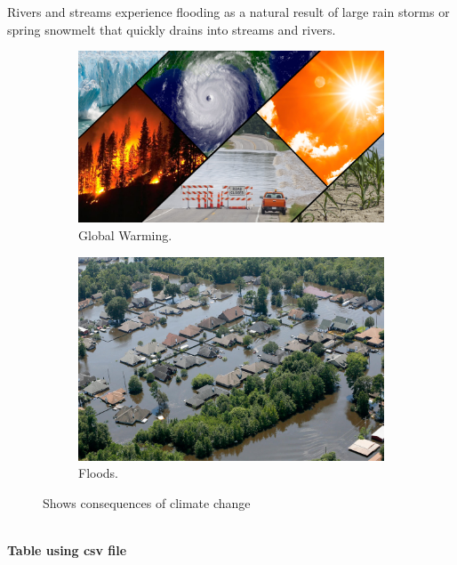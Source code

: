 \documentclass{article}
\begin{document}
\newpage
Rivers and streams experience flooding as a natural result of large rain storms or spring snowmelt that quickly drains into streams and rivers.
\begin{figure}[h!]
  \centering
  \begin{subfigure}[b]{0.47\linewidth}
    \includegraphics[width=\linewidth]{c.jpg}
    \caption{Global Warming.}
  \end{subfigure}
  \begin{subfigure}[b]{0.4\linewidth}
    \includegraphics[width=\linewidth]{flood.jpg}
    \caption{Floods.}
  \end{subfigure}
  \caption{Shows consequences of climate change}
  \label{fig:coffee}
\end{figure}
\\
\textbf{Table using csv file}\\\\
\end{document}
